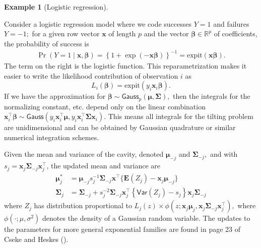 \documentclass[
  11pt,
  letterpaper,
]{scrbook}
\theoremstyle{plain}
\theoremstyle{definition}
\theoremstyle{definition}
\newtheorem{example}{Example}[chapter]
\theoremstyle{plain}
\theoremstyle{plain}
\theoremstyle{definition}
\theoremstyle{remark}
\begin{document}
\begin{example}[Logistic
regression]\protect\hypertarget{exm-logistic-ep}{}\label{exm-logistic-ep}

Consider a logistic regression model where we code successes \(Y=1\) and
failures \(Y=-1;\) for a given row vector \(\mathbf{x}\) of length \(p\)
and the vector \(\boldsymbol{\beta} \in \mathbb{R}^p\) of coefficients,
the probability of success is \begin{align*}
\Pr(Y=1 \mid \mathbf{x}, \boldsymbol{\beta}) = \left\{1+\exp(-\mathbf{x}\boldsymbol{\beta})\right\}^{-1} = \mathrm{expit}(\mathbf{x}\boldsymbol{\beta}).
\end{align*} The term on the right is the logistic function. This
reparametrization makes it easier to write the likelihood contribution
of observation \(i\) as
\[L_i(\boldsymbol{\beta}) = \mathrm{expit}(y_i \mathbf{x}_i\boldsymbol{\beta}).\]
If we have the approximation for
\(\boldsymbol{\beta} \sim \mathsf{Gauss}_p(\boldsymbol{\mu}, \boldsymbol{\Sigma}),\)
then the integrals for the normalizing constant, etc. depend only on the
linear combination
\(\mathbf{x}_i^\top\boldsymbol{\beta} \sim \mathsf{Gauss}(y_i \mathbf{x}_i^\top\boldsymbol{\mu}, y_i \mathbf{x}_i^\top\boldsymbol{\Sigma}\mathbf{x}_i).\)
This means all integrals for the tilting problem are unidimensional and
can be obtained by Gaussian quadrature or similar numerical integration
schemes.

Given the mean and variance of the cavity, denoted
\(\boldsymbol{\mu}_{-j}\) and \(\boldsymbol{\Sigma}_{-j},\) and with
\(s_j = \mathbf{x}_j\boldsymbol{\Sigma}_{-j}\mathbf{x}_j^\top\), the
updated mean and variance are \begin{align*}
\boldsymbol{\mu}_j^* &= \boldsymbol{\mu}_{-j} s_j^{-1}\boldsymbol{\Sigma}_{-j}\mathbf{x}^\top \{\mathbf{E}(Z_j) -\mathbf{x}_j\boldsymbol{\mu}_{-j}\} \\
\boldsymbol{\Sigma}_{j} &=\boldsymbol{\Sigma}_{-j} + s_j^{-2}\boldsymbol{\Sigma}_{-j}\mathbf{x}^\top_j\left\{\mathsf{Var}(Z_j) - s_j\right\}\mathbf{x}_j\boldsymbol{\Sigma}_{-j}
\end{align*} where \(Z_j\) has distribution proportional to
\(L_j(z) \times \phi(z; \mathbf{x}_j\boldsymbol{\mu}_j, \mathbf{x}_j\boldsymbol{\Sigma}_{-j}\mathbf{x}_j^\top),\)
where \(\phi(\cdot; \mu, \sigma^2)\) denotes the density of a Gaussian
random variable. The updates to the parameters for more general
exponential families are found in page 23 of Cseke and Heskes
().


\end{example}
\end{document}
